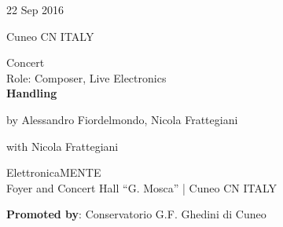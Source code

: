 \documentclass[7pt,a4paper]{article}
\begin{document}
\begin{mdframed}[
    backgroundcolor=entrygray,
    linecolor=entrygray,
    linewidth=0pt,
    innerleftmargin=6pt,
    innerrightmargin=6pt,
    innertopmargin=6pt,
    innerbottommargin=6pt,
    skipabove=0pt,
    skipbelow=0pt
]

\begin{minipage}[t]{0.28\textwidth}

22 Sep 2016

\scriptsize Cuneo CN ITALY


\end{minipage}
\begin{minipage}[t]{0.68\textwidth}
\small Concert
\\\scriptsize Role: Composer, Live Electronics
\\ \normalsize \textbf{Handling}
\par\scriptsize by Alessandro Fiordelmondo, Nicola Frattegiani
\par\scriptsize with Nicola Frattegiani
\vspace{0.25cm}



\small ElettronicaMENTE\\Foyer and Concert Hall “G. Mosca” | \scriptsize Cuneo CN ITALY

\vspace{0.1cm}
\scriptsize

\vspace{0.1cm}
\par \textbf{Promoted by}: Conservatorio G.F. Ghedini di Cuneo
\end{minipage}
\vspace{0.25cm}
\end{mdframed}
\end{document}
